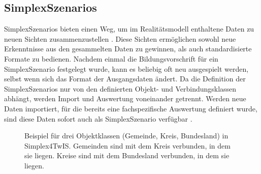 \subsection{SimplexSzenarios}
\label{sec:simplex-scenarios}

SimplexSzenarios bieten einen Weg, um im Realitätsmodell enthaltene Daten zu neuen Sichten zusammenzustellen \parencite{grossmannEnvVisioUniverselle2021}. Diese Sichten ermöglichen sowohl neue Erkenntnisse aus den gesammelten Daten zu gewinnen, als auch standardisierte Formate zu bedienen. Nachdem einmal die Bildungsvorschrift für ein SimplexSzenario festgelegt wurde, kann es beliebig oft neu ausgespielt werden, selbst wenn sich das Format der Ausgangsdaten ändert. Da die Definition der SimplexSzenarios nur von den definierten Objekt- und Verbindungsklassen abhängt, werden Import und Auswertung voneinander getrennt. Werden neue Daten importiert, für die bereits eine fachspezifische Auswertung definiert wurde, sind diese Daten sofort auch als SimplexSzenario verfügbar \parencite{rudolfUmweltdatenIntelligenz2021}.

\begin{figure}[!ht]
  \centering
  \caption{Beispiel für drei Objektklassen (Gemeinde, Kreis, Bundesland) in Simplex4TwIS. Gemeinden sind mit dem Kreis verbunden, in dem sie liegen. Kreise sind mit dem Bundesland verbunden, in dem sie liegen.}
  \label{fig:s4d-szenario-example}
\end{figure}

